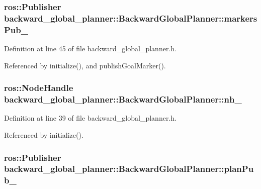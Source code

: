 \subsubsection[{\texorpdfstring{markers\+Pub\+\_\+}{markersPub_}}]{\setlength{\rightskip}{0pt plus 5cm}ros\+::\+Publisher backward\+\_\+global\+\_\+planner\+::\+Backward\+Global\+Planner\+::markers\+Pub\+\_\+\hspace{0.3cm}{\ttfamily [private]}}\hypertarget{classbackward__global__planner_1_1BackwardGlobalPlanner_a02e3724cf09622d3f107e3476040add4}{}\label{classbackward__global__planner_1_1BackwardGlobalPlanner_a02e3724cf09622d3f107e3476040add4}


Definition at line 45 of file backward\+\_\+global\+\_\+planner.\+h.



Referenced by initialize(), and publish\+Goal\+Marker().

\subsubsection[{\texorpdfstring{nh\+\_\+}{nh_}}]{\setlength{\rightskip}{0pt plus 5cm}ros\+::\+Node\+Handle backward\+\_\+global\+\_\+planner\+::\+Backward\+Global\+Planner\+::nh\+\_\+\hspace{0.3cm}{\ttfamily [private]}}\hypertarget{classbackward__global__planner_1_1BackwardGlobalPlanner_a4e828d988f4c66711e3144d210d2f80a}{}\label{classbackward__global__planner_1_1BackwardGlobalPlanner_a4e828d988f4c66711e3144d210d2f80a}


Definition at line 39 of file backward\+\_\+global\+\_\+planner.\+h.



Referenced by initialize().

\subsubsection[{\texorpdfstring{plan\+Pub\+\_\+}{planPub_}}]{\setlength{\rightskip}{0pt plus 5cm}ros\+::\+Publisher backward\+\_\+global\+\_\+planner\+::\+Backward\+Global\+Planner\+::plan\+Pub\+\_\+\hspace{0.3cm}{\ttfamily [private]}}\hypertarget{classbackward__global__planner_1_1BackwardGlobalPlanner_ad51fd6aecf673a500ec828b796d68228}{}\label{classbackward__global__planner_1_1BackwardGlobalPlanner_ad51fd6aecf673a500ec828b796d68228}


